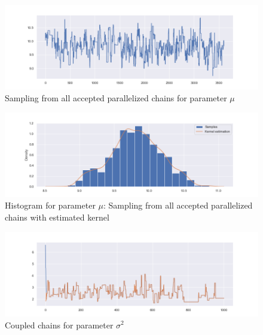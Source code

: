 \documentclass {article}
\begin{document}
\begin{figure}[h!]
	\centering
	\includegraphics[width=\textwidth]{doublecoupling_pack/doublecoupling_sampling_mu}
	\caption{Sampling from all accepted parallelized chains for parameter $\mu$ }   %
	\label{muallsamdouble}
\end{figure}


\begin{figure}[h!]
	\centering
	\includegraphics[width=\textwidth]{doublecoupling_pack/doublecoupling_mu_histogram_kernel}
	\caption{Histogram for parameter $\mu$: Sampling from all accepted parallelized chains with estimated kernel }   %
	\label{muhistdouble}
\end{figure}






\begin{figure}[h!]
	\centering
	\includegraphics[width=\textwidth]{doublecoupling_pack/doublecoupling_sigma_chain_meeting}
	\caption{Coupled chains for parameter $\sigma^2$ }   %
	\label{sigmacoupledchains}
\end{figure}
\end{document}
